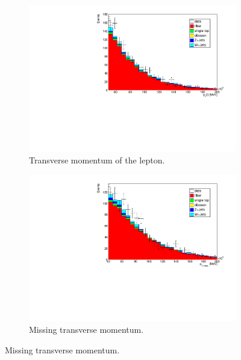 \begin{figure}[H]%
  \begin{subfigure}{0.48\textwidth}%
    \centering%
    \includegraphics[width=\textwidth]{plots/comparism/lep_pt.pdf}%
    \caption{Transverse momentum of the lepton.}%
    \label{fig:6a}%
  \end{subfigure}%
  \hfill
  \begin{subfigure}{0.48\textwidth}%
    \centering%
    \includegraphics[width=\textwidth]{plots/comparism/met_et.pdf}%
    \caption{Missing transverse momentum.}%
    \label{fig:6b}%
  \end{subfigure}%


\end{figure}
